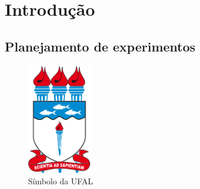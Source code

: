 \chapter{Introdução}
\label{chap:Exemlos}

\section{Planejamento de experimentos}
\label{sec:Exemplo de imagem}

\begin{figure}[!hbt]
	\centering
	\caption{Símbolo da UFAL}
	\label{fig:1_possuem_celular}
	\includegraphics[width=0.25\textwidth]{imagens/ufal}
	
\end{figure}
